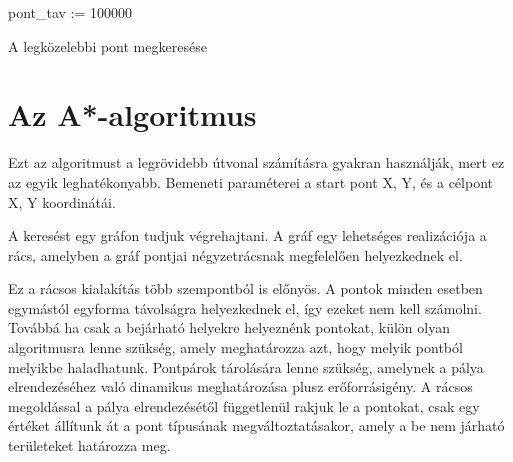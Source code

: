 
\begin{algorithm}[H]
 pont\_tav := 100000\;
 \caption{A legközelebbi pont megkeresése}
\end{algorithm} 

\section{Az A*-algoritmus}


Ezt az algoritmust a legrövidebb útvonal számításra gyakran használják, mert ez az egyik leghatékonyabb. Bemeneti paraméterei a start pont X, Y, és a célpont X, Y koordinátái. 

A keresést egy gráfon tudjuk végrehajtani. A gráf egy lehetséges realizációja a rács, amelyben a gráf pontjai négyzetrácsnak megfelelően helyezkednek el.

Ez a rácsos kialakítás több szempontból is előnyös. A pontok minden esetben egymástól egyforma távolságra helyezkednek el, így ezeket nem kell számolni. Továbbá ha csak a bejárható helyekre helyeznénk pontokat, külön olyan algoritmusra lenne szükség, amely meghatározza azt, hogy melyik pontból melyikbe haladhatunk. Pontpárok tárolására lenne szükség, amelynek a pálya elrendezéséhez való dinamikus meghatározása plusz erőforrásigény. A rácsos megoldással a pálya elrendezésétől függetlenül rakjuk le a pontokat, csak egy értéket állítunk át a pont típusának megváltoztatásakor, amely a be nem járható területeket határozza meg.

